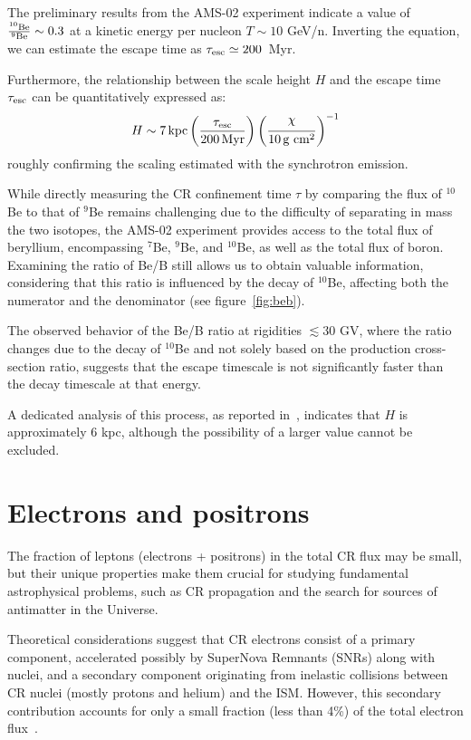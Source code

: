 The preliminary results from the AMS-02 experiment indicate a value of $\frac{\rm {^{10}}Be}{\rm {^{9}}Be} \sim 0.3$ at a kinetic energy per nucleon $T \sim 10$ GeV/n. Inverting the equation, we can estimate the escape time as $\tau_{\rm esc} \simeq 200$~Myr.

Furthermore, the relationship between the scale height $H$ and the escape time $\tau_{\rm esc}$ can be quantitatively expressed as:
%
\begin{equation}
H \sim 7 \, \text{kpc} \left(\frac{\tau_{\rm esc}}{200 \, \text{Myr}}\right) \left(\frac{\rchi}{10 \, \text{g cm}^2}\right)^{-1}
\end{equation}
%
roughly confirming the scaling estimated with the synchrotron emission.

While directly measuring the CR confinement time $\tau$ by comparing the flux of $^{10}$Be to that of $^9$Be remains challenging due to the difficulty of separating in mass the two isotopes, the AMS-02 experiment provides access to the total flux of beryllium, encompassing $^7$Be, $^9$Be, and $^{10}$Be, as well as the total flux of boron.
%
Examining the ratio of Be/B still allows us to obtain valuable information, considering that this ratio is influenced by the decay of $^{10}$Be, affecting both the numerator and the denominator (see figure~\ref{fig:beb}).

The observed behavior of the Be/B ratio at rigidities $\lesssim 30$ GV, where the ratio changes due to the decay of $^{10}$Be and not solely based on the production cross-section ratio, suggests that the escape timescale is not significantly faster than the decay timescale at that energy.

A dedicated analysis of this process, as reported in~\cite{Evoli2020prd,Weinrich2020aab,Maurin2022aa}, indicates that $H$ is approximately 6 kpc, although the possibility of a larger value cannot be excluded.

\section{Electrons and positrons}
\label{sec:leptons}

The fraction of leptons (electrons + positrons) in the total CR flux may be small, but their unique properties make them crucial for studying fundamental astrophysical problems, such as CR propagation and the search for sources of antimatter in the Universe.

Theoretical considerations suggest that CR electrons consist of a primary component, accelerated possibly by SuperNova Remnants (SNRs) along with nuclei, and a secondary component originating from inelastic collisions between CR nuclei (mostly protons and helium) and the ISM. However, this secondary contribution accounts for only a small fraction (less than 4\%) of the total electron flux~\cite{Moskalenko1998apj,Delahaye2010aa,Evoli2021prd}.

